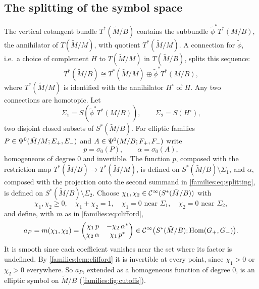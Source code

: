 \subsection{The splitting of the symbol space}
The vertical cotangent bundle $T^*(\tilde M/B)$ contains the subbundle
$\tilde\phi^*T^*(M/B)$, the annihilator of $T(\tilde M/M)$, with quotient
$T^*(\tilde M/M)$. A connection for $\tilde\phi$, i.e.\ a choice of
complement $H$ to $T(\tilde M/M)$ in $T(\tilde M/B)$, splits this sequence:
\begin{equation}\label{families:eq:splitting}
  T^*(\tilde M/B)\cong T^*(\tilde M/M)\oplus\tilde\phi^*T^*(M/B),
\end{equation}
where $T^*(\tilde M/M)$ is identified with the annihilator $H^\circ$ of $H$.
Any two connections are homotopic. Let
\begin{equation*}
  \Sigma_1=S(\tilde\phi^*T^*(M/B)),\qquad\Sigma_2=S(H^\circ),
\end{equation*}
two disjoint closed subsets of $S^*(\tilde M/B)$. For elliptic families
$P\in\Psi^{0}(\tilde M/M;E_+,E_-)$ and $A\in\Psi^{0}(M/B;F_+,F_-)$ write
\begin{equation*}
  p=\sigma_0(P),\qquad\alpha=\sigma_0(A),
\end{equation*}
homogeneous of degree $0$ and invertible. The function $p$, composed with
the restriction map $T^*(\tilde M/B)\to T^*(\tilde M/M)$, is defined on
$S^*(\tilde M/B)\setminus\Sigma_1$, and $\alpha$, composed with the projection
onto the second summand in \eqref{families:eq:splitting}, is defined on
$S^*(\tilde M/B)\setminus\Sigma_2$. Choose $\chi_1,\chi_2\in\mathcal{C}^\infty(S^*(\tilde
M/B))$ with
\begin{equation}\label{families:eq:cutoffs}
  \chi_1,\chi_2\ge0,\quad\chi_1+\chi_2=1,\quad\chi_1=0\text{ near }\Sigma_1,
  \quad\chi_2=0\text{ near }\Sigma_2,
\end{equation}
and define, with $m$ as in \eqref{families:eq:clifford},
\begin{equation}\label{families:eq:aP}
  a_P=m(\chi_1,\chi_2)=\begin{pmatrix}\chi_1\,p&-\chi_2\,\alpha^*\\
  \chi_2\,\alpha&\chi_1\,p^*\end{pmatrix}\in\mathcal{C}^\infty\bigl(S^*(\tilde M/B);
  \operatorname{Hom}(G_+,G_-)\bigr).
\end{equation}
It is smooth since each coefficient vanishes near the set where its factor is
undefined. By \cref{families:lem:clifford} it is invertible at every point,
since $\chi_1>0$ or $\chi_2>0$ everywhere. So $a_P$, extended as a homogeneous
function of degree $0$, is an elliptic symbol on $\tilde M/B$
(\cref{families:fig:cutoffs}).

